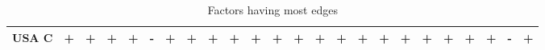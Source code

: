 \documentclass[12pt,bibliography=totoc]{article}
\begin{document}
\begin{appendices}
\begin{table}[H]
\begin{tabular}{l  cccccccc@{\hskip 0.2in}  cccccccc@{\hskip 0.2in}   ccccccc}
USA C	&\cellcolor{green!25}+	&\cellcolor{green!25}+	&\cellcolor{green!25}+	&\cellcolor{green!25}+	&\cellcolor{red!25}-	&\cellcolor{green!25}+	&\cellcolor{green!25}+	&\cellcolor{green!25}+	&\cellcolor{green!25}+	&\cellcolor{green!25}+	&\cellcolor{green!25}+	&\cellcolor{green!25}+	&\cellcolor{green!25}+	&\cellcolor{green!25}+	&\cellcolor{green!25}+	&\cellcolor{green!25}+	&\cellcolor{green!25}+	&\cellcolor{green!25}+	&\cellcolor{green!25}+	&\cellcolor{green!25}+	&\cellcolor{green!25}+	&\cellcolor{red!25}-	&\cellcolor{green!25}+\\


\hline            
\end{tabular}
\caption{Factors having most edges} %

\end{table}



\begin{figure}[H]


\end{figure}
\end{appendices}
\end{document}
